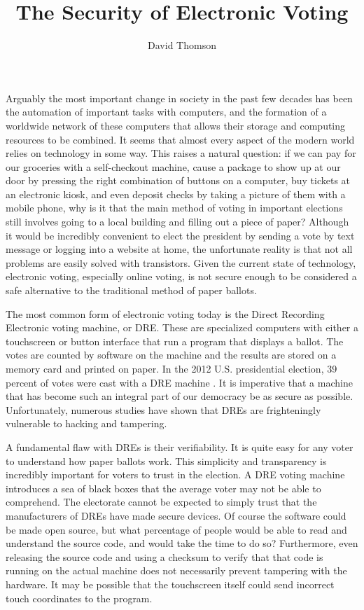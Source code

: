 \documentclass[12pt, titlepage]{article}
\begin{document}
\title{The Security of Electronic Voting}
\author{David Thomson}
\maketitle

Arguably the most important change in society in the past few decades has been the automation of important tasks with computers, and the formation of a worldwide network of these computers that allows their storage and computing resources to be combined. It seems that almost every aspect of the modern world relies on technology in some way. This raises a natural question: if we can pay for our groceries with a self-checkout machine, cause a package to show up at our door by pressing the right combination of buttons on a computer, buy tickets at an electronic kiosk, and even deposit checks by taking a picture of them with a mobile phone, why is it that the main method of voting in important elections still involves going to a local building and filling out a piece of paper? Although it would be incredibly convenient to elect the president by sending a vote by text message or logging into a website at home, the unfortunate reality is that not all problems are easily solved with transistors. Given the current state of technology, electronic voting, especially online voting, is not secure enough to be considered a safe alternative to the traditional method of paper ballots.

The most common form of electronic voting today is the Direct Recording Electronic voting machine, or DRE. These are specialized computers with either a touchscreen or button interface that run a program that displays a ballot. The votes are counted by software on the machine and the results are stored on a memory card and printed on paper. In the 2012 U.S. presidential election, 39 percent of votes were cast with a DRE machine \cite{kalb2015guide}. It is imperative that a machine that has become such an integral part of our democracy be as secure as possible. Unfortunately, numerous studies have shown that DREs are frighteningly vulnerable to hacking and tampering.

A fundamental flaw with DREs is their verifiability. It is quite easy for any voter to understand how paper ballots work. This simplicity and transparency is incredibly important for voters to trust in the election. A DRE voting machine introduces a sea of black boxes that the average voter may not be able to comprehend. The electorate cannot be expected to simply trust that the manufacturers of DREs have made secure devices. Of course the software could be made open source, but what percentage of people would be able to read and understand the source code, and would take the time to do so? Furthermore, even releasing the source code and using a checksum to verify that that code is running on the actual machine does not necessarily prevent tampering with the hardware. It may be possible that the touchscreen itself could send incorrect touch coordinates to the program.
\end{document}
